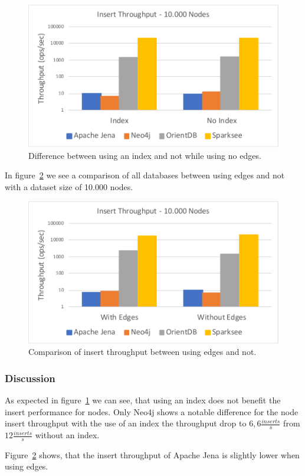 \begin{figure}[h!]
  \centering
  \includegraphics[width=.75\textwidth]{images/throughput/noEdges}
  \caption{Difference between using an index and not while using no edges.}
  \label{fig:noEdges}
\end{figure}

In figure~\ref{fig:indexNoEdges10000Nodes} we see a comparison of all databases between using edges and not with a dataset size of 10.000 nodes.

\begin{figure}[h!]
  \centering
  \includegraphics[width=.75\textwidth]{images/throughput/indexNoEdges10000Nodes}
  \caption{Comparison of insert throughput between using edges and not.}
  \label{fig:indexNoEdges10000Nodes}
\end{figure}

\subsubsection{Discussion}
As expected in figure~\ref{fig:noEdges} we can see,
that using an index does not benefit the insert performance for nodes.
Only Neo4j shows a notable difference for the node insert throughput with the use of an index the throughput drop to $ 6,6 \frac{inserts}{s} $ from $ 12 \frac{inserts}{s} $ without an index.

Figure~\ref{fig:indexNoEdges10000Nodes} shows,
that the insert throughput of Apache Jena is slightly lower when using edges.

